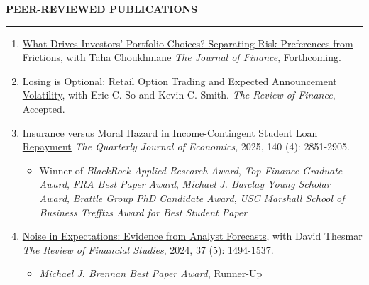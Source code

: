 \documentclass[a4paper, 10pt]{article}
\newcounter{mycounter}
\newcommand{\cvsec}[1]
{
	\needspace{2\baselineskip}
	\noindent \textbf{#1}
	
	\vspace{2pt}
	
	\hrule
	
	\bigskip
}
\newenvironment{cvcontinue}[1]
{
	\cvsec{#1}
	\begin{enumerate}
		\setcounter{enumi}{\themycounter}
	}
	{
	\setcounter{mycounter}{\theenumi}
	\end{enumerate}
}
\begin{document}
\begin{cvcontinue}{PEER-REVIEWED PUBLICATIONS}
	\item \href{https://www.timdesilva.me/files/papers/preferences_frictions.pdf}{What Drives Investors' Portfolio Choices? Separating Risk Preferences from Frictions}, with Taha Choukhmane \newline \emph{The Journal of Finance}, Forthcoming.
	\item \href{https://www.timdesilva.me/files/papers/losing_optional.pdf}{Losing is Optional: Retail Option Trading and Expected Announcement Volatility}, with Eric C. So and Kevin C. Smith.  \newline \emph{The Review of Finance}, Accepted.
	\item \href{https://www.timdesilva.me/files/papers/jmp_deSilva.pdf}{Insurance versus Moral Hazard in Income-Contingent Student Loan Repayment} \newline \emph{The Quarterly Journal of Economics}, 2025, 140 (4): 2851-2905.
	\begin{itemize}
		\item Winner of \emph{BlackRock Applied Research Award}, \emph{Top Finance Graduate Award}, \emph{FRA Best Paper Award}, \emph{Michael J. Barclay Young Scholar Award}, \emph{Brattle Group PhD Candidate Award}, \emph{USC Marshall School of Business Trefftzs Award for Best Student Paper}
	\end{itemize}
	\item \href{https://www.timdesilva.me/files/papers/noise_expectations.pdf}{Noise in Expectations: Evidence from Analyst Forecasts}, with David Thesmar \newline \emph{The Review of Financial Studies}, 2024, 37 (5): 1494-1537.
	\begin{itemize}
		\item \emph{Michael J. Brennan Best Paper Award}, Runner-Up
	\end{itemize}
\end{cvcontinue}
\end{document}
